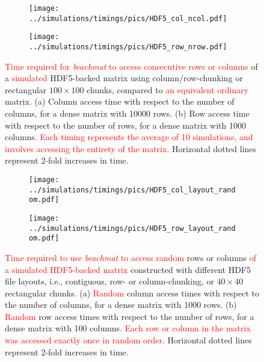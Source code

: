 \documentclass{article}
\newcommand{\beachmat}{\textit{beachmat}}
\newcommand{\revised}[1]{\textcolor{red}{#1}}
\begin{document}
\begin{figure}[bt]
    \begin{subfigure}[b]{0.49\textwidth}
        \texttt{[image: ../simulations/timings/pics/HDF5\_col\_ncol.pdf]}
        \caption{}
    \end{subfigure}
    \begin{subfigure}[b]{0.49\textwidth}
        \texttt{[image: ../simulations/timings/pics/HDF5\_row\_nrow.pdf]}
        \caption{}
    \end{subfigure}
    \caption{\revised{Time required for \beachmat{} to access consecutive rows or columns} of a \revised{simulated} HDF5-backed matrix using column/row-chunking or rectangular $100\times100$ chunks, compared to \revised{an equivalent ordinary} matrix.
        (a) Column access time with respect to the number of columns, for a dense matrix with 10000 rows.
        (b) Row access time with respect to the number of rows, for a dense matrix with 1000 columns.
        \revised{Each timing represents the average of 10 simulations, and involves accessing the entirety of the matrix.}
        Horizontal dotted lines represent 2-fold increases in time.
    }
    \label{fig:hdf5time}
\end{figure}

\begin{figure}[bt]
    \begin{subfigure}[b]{0.49\textwidth}
        \texttt{[image: ../simulations/timings/pics/HDF5\_col\_layout\_random.pdf]}
        \caption{}
    \end{subfigure}
    \begin{subfigure}[b]{0.49\textwidth}
        \texttt{[image: ../simulations/timings/pics/HDF5\_row\_layout\_random.pdf]}
        \caption{}
    \end{subfigure}
    \caption{\revised{Time required to use \beachmat{} to access random} rows or columns \revised{of a simulated HDF5-backed matrix} constructed with different HDF5 file layouts, 
        i.e., contiguous, row- or column-chunking, or $40\times40$ rectangular chunks.
        (a) \revised{Random} column access times with respect to the number of columns, for a dense matrix with 1000 rows.
        (b) \revised{Random} row access times with respect to the number of rows, for a dense matrix with 100 columns.
        \revised{Each row or column in the matrix was accessed exactly once in random order.}
        Horizontal dotted lines represent 2-fold increases in time.
    }
    \label{fig:hdf5layoutrandom}
\end{figure}
\end{document}

